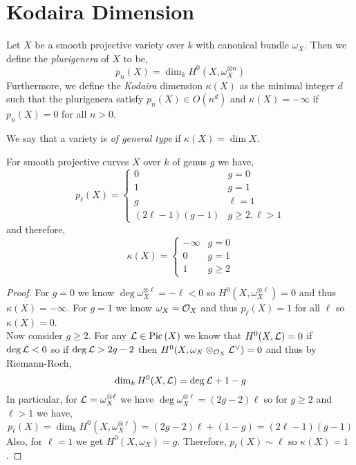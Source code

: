 \documentclass[12pt]{article}
\begin{document}
\section{Kodaira Dimension}

\begin{defn}
Let $X$ be a smooth projective variety over $k$ with canonical bundle $\omega_X$. Then we define the \textit{plurigenera} of $X$ to be,
\[ p_n(X) = \dim_k H^0(X, \omega_X^{\otimes n}) \]
Furthermore, we define the \textit{Kodaira} dimension $\kappa(X)$ as the minimal integer $d$ such that the plurigenera satisfy $p_n(X) \in O(n^d)$ and $\kappa(X) = - \infty$ if $p_n(X) = 0$ for all $n > 0$.
\end{defn}

\begin{defn}
We say that a variety is \textit{of general type} if $\kappa(X) = \dim{X}$.
\end{defn}

\begin{prop}
For smooth projective curves $X$ over $k$ of genus $g$ we have,
\[ p_\ell(X) = 
\begin{cases}
0 & g = 0
\\
1 & g = 1
\\
g & \ell = 1
\\
(2 \ell - 1)(g - 1) & g \ge 2, \ell > 1
\end{cases} \]
and therefore,
\[ \kappa(X) = 
\begin{cases}
- \infty & g = 0
\\
0 & g = 1
\\
1 & g \ge 2
\end{cases} \]
\end{prop}

\begin{proof}
For $g = 0$ we know $\deg{\omega_X^{\otimes \ell}} = - \ell < 0$ so $H^0(X, \omega_X^{\otimes \ell}) = 0$ and thus $\kappa(X) = -\infty$. For $g = 1$ we know $\omega_X = \mathcal{O}_{X}$ and thus $p_\ell(X) = 1$ for all $\ell$ so $\kappa(X) = 0$.
\bigskip\\
Now consider $g \ge 2$. For any $\mathcal{L} \in \mathrm{Pic} \left( X \right)$ we know that $H^0(X, \mathcal{L}) = 0$ if $\deg{\mathcal{L}} < 0$ so if $\deg{\mathcal{L}} > 2g - 2$ then $H^0(X, \omega_X \otimes_{\mathcal{O}_{X}} \mathcal{L}^\vee) = 0$ and thus by Riemann-Roch,
\[ \dim_k H^0(X, \mathcal{L}) = \deg{\mathcal{L}} + 1 - g \]
In particular, for $\mathcal{L} = \omega_X^{\otimes \ell}$ we have $\deg{\omega_X^{\otimes \ell}} = (2 g - 2) \ell$ so for $g \ge 2$ and $\ell > 1$ we have,
\[  p_\ell(X) = \dim_k H^0(X, \omega_X^{\otimes \ell}) = (2 g - 2) \ell + (1 - g) = (2 \ell - 1)(g - 1) \]
Also, for $\ell = 1$ we get $H^0(X, \omega_X) = g$. Therefore, $p_\ell(X) \sim \ell$ so $\kappa(X) = 1$. 
\end{proof}
\end{document}
